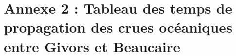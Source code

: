 \documentclass[11pt]{article}
\begin{document}
%        
%

\FloatBarrier
\newpage
\section{Annexe 2 : Tableau des temps de propagation des crues océaniques entre Givors et Beaucaire}
\label{sec:TabPropag}
\end{document}
